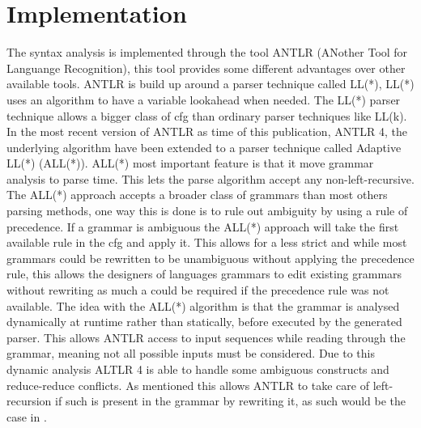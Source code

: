 \section{Implementation}

The syntax analysis is implemented through the tool ANTLR (ANother Tool for Languange Recognition), this tool provides some different advantages over other available tools.
ANTLR is build up around  a parser technique called LL(*), LL(*) uses an algorithm to have a variable lookahead when needed.
The LL(*) parser technique allows a bigger class of \acrshort{cfg} than ordinary parser techniques like LL(k).
In the most recent version of ANTLR as time of this publication, ANTLR 4, the underlying algorithm have been extended to a parser technique called Adaptive LL(*) (ALL(*)).
ALL(*) most important feature is that it move grammar analysis to parse time. 
This lets the parse algorithm accept any non-left-recursive.
The ALL(*) approach accepts a broader class of grammars than most others parsing methods, one way this is done is to rule out ambiguity by using a rule of precedence.
If a grammar is ambiguous the ALL(*) approach will take the first  available rule in the \acrshort{cfg} and apply it.
This allows for a less strict  and while most grammars could be rewritten to be unambiguous without applying the precedence rule, this allows the designers of languages grammars to edit existing grammars without rewriting as much a could be required if the precedence rule was not available.	
The idea with the ALL(*) algorithm is that the grammar is analysed dynamically at runtime rather than statically, before executed by the generated parser.
This allows ANTLR access to input sequences while reading through the grammar, meaning not all possible inputs must be considered.
Due to this dynamic analysis ALTLR 4 is able to handle some ambiguous constructs and reduce-reduce conflicts.
As mentioned this allows ANTLR to take care of left-recursion if such is present in the grammar by rewriting it, as such would be the case in .

